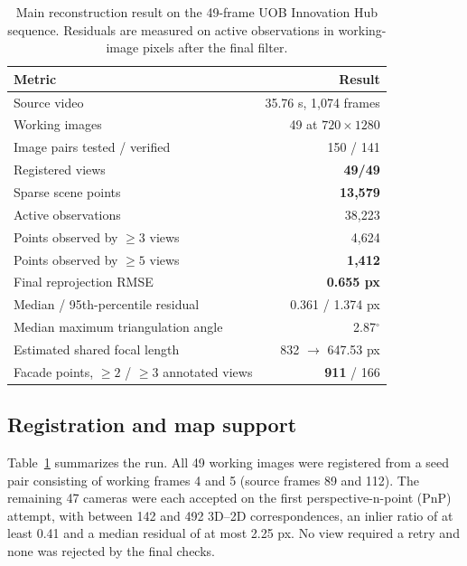 \documentclass[11pt,a4paper]{article}
\begin{document}
\begin{table}[htbp]
  \centering
  \small
  \begin{tabular}{@{}lr@{}}
    \toprule
    Metric & Result \\
    \midrule
    Source video & 35.76 s, 1{,}074 frames \\
    Working images & 49 at \(720 \times 1280\) \\
    Image pairs tested / verified & 150 / 141 \\
    Registered views & \textbf{49/49} \\
    Sparse scene points & \textbf{13{,}579} \\
    Active observations & 38{,}223 \\
    Points observed by \(\geq 3\) views & 4{,}624 \\
    Points observed by \(\geq 5\) views & \textbf{1{,}412} \\
    Final reprojection RMSE & \textbf{0.655 px} \\
    Median / 95th-percentile residual & 0.361 / 1.374 px \\
    Median maximum triangulation angle & 2.87\(^{\circ}\) \\
    Estimated shared focal length & 832 \(\rightarrow\) 647.53 px \\
    Facade points, \(\geq 2\) / \(\geq 3\) annotated views & \textbf{911} / 166 \\
    \bottomrule
  \end{tabular}
  \caption{Main reconstruction result on the 49-frame UOB Innovation Hub sequence. Residuals are measured on active observations in working-image pixels after the final filter.}
  \label{tab:results}
\end{table}

\subsection{Registration and map support}
\label{sec:discussion-registration}

Table~\ref{tab:results} summarizes the run. All 49 working images were registered from a seed pair consisting of working frames 4 and 5 (source frames 89 and 112). The remaining 47 cameras were each accepted on the first perspective-n-point (PnP) attempt, with between 142 and 492 3D--2D correspondences, an inlier ratio of at least 0.41 and a median residual of at most 2.25 px. No view required a retry and none was rejected by the final checks.
\end{document}
